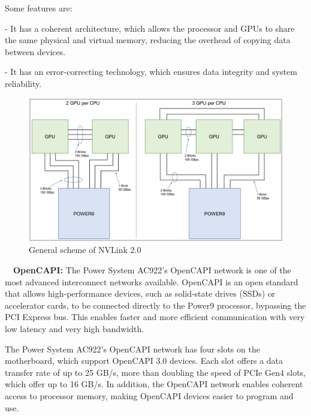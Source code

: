 \documentclass{report}
\begin{document}
\noindent Some features are:

\setlength{\parindent}{2em}
- It has a coherent architecture, which allows the processor and GPUs to share the same physical and virtual memory, reducing the overhead of copying data between devices.

- It has an error-correcting technology, which ensures data integrity and system reliability.
\setlength{\parindent}{0em}


\begin{figure}[H]
  \centering
  \includegraphics[scale=0.52]{img/NVLink.jpg}
  \caption{General scheme of NVLink 2.0}
  \label{fig:General scheme of NVLink 2.0}
\end{figure}

\cleardoublepage

\setlength{\parindent}{1em}
\CIRCLE \ \ \textbf{OpenCAPI:} The Power System AC922's OpenCAPI network is one of the most advanced interconnect 
networks available. OpenCAPI is an open standard that allows high-performance devices, such as solid-state drives 
(SSDs) or accelerator cards, to be connected directly to the Power9 processor, bypassing the PCI Express bus.
This enables faster and more efficient communication with very low latency and very high bandwidth.

\setlength{\parindent}{0em}
The Power System AC922's OpenCAPI network has four slots on the motherboard, which support OpenCAPI 3.0 devices.
Each slot offers a data transfer rate of up to 25 GB/s, more than doubling the speed of PCIe Gen4 slots, which
offer up to 16 GB/s. In addition, the OpenCAPI network enables coherent access to processor memory, making 
OpenCAPI devices easier to program and use.
\end{document}
